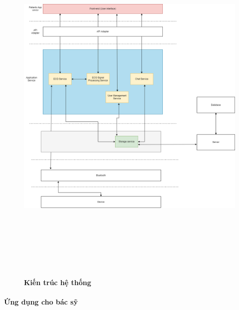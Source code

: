 \documentclass{article}%
\begin{document}
\begin{figure}[H]
  \centering
  \includegraphics[width=16cm,height=18cm]{Images/system/fmECG_architecture-Patient.drawio.png}
  \caption[Kiến trúc hệ thống]{\bfseries \fontsize{12pt}{0pt}\selectfont Kiến trúc hệ thống}
  \label{hinh15} %
\end{figure}

\paragraph{Ứng dụng cho bác sỹ}
\mbox{}
\end{document}
